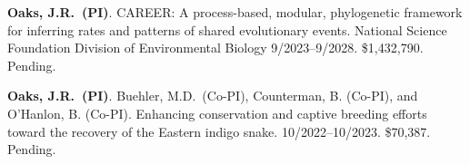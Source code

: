 \myHangIndent
\textbf{Oaks, J.R.\ (PI)}.
CAREER: A process-based, modular, phylogenetic framework for inferring rates
and patterns of shared evolutionary events.
National Science Foundation Division of Environmental Biology
9/2023--9/2028.
\$1,432,790.
Pending.

\myHangIndent
\textbf{Oaks, J.R.\ (PI)}.
\phdsymbol{}Buehler, M.D.\ (Co-PI),
Counterman, B. (Co-PI),
and
O'Hanlon, B. (Co-PI).
Enhancing conservation and captive breeding efforts toward the recovery of the Eastern indigo snake.
10/2022--10/2023.
\$70,387.
Pending.
